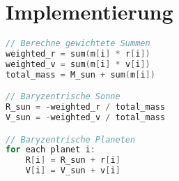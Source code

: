 \section{Implementierung}

\begin{lstlisting}[language=C++,caption={Pseudocode für die Transformation}]
// Berechne gewichtete Summen
weighted_r = sum(m[i] * r[i])
weighted_v = sum(m[i] * v[i])
total_mass = M_sun + sum(m[i])

// Baryzentrische Sonne
R_sun = -weighted_r / total_mass
V_sun = -weighted_v / total_mass

// Baryzentrische Planeten
for each planet i:
    R[i] = R_sun + r[i]
    V[i] = V_sun + v[i]
\end{lstlisting}

